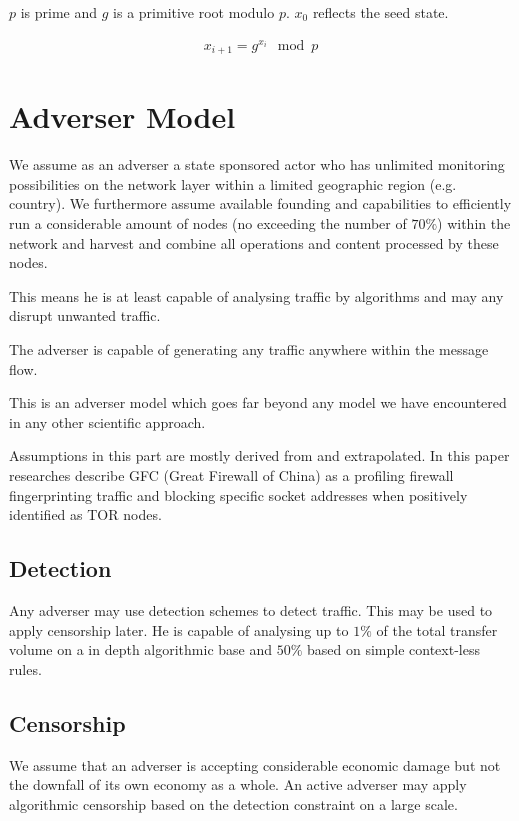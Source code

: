 \documentclass[9pt,journal,compsoc]{IEEEtran}
\begin{document}
$p$ is prime and $g$ is a primitive root modulo $p$. $x_0$ reflects the seed state.

\begin{eqnarray}
x_{i+1}=g^{x_i}\mod p
\end{eqnarray}


\section{Adverser Model\label{sec:adverser}}
We assume as an adverser a state sponsored actor who has unlimited monitoring possibilities on the network layer within a limited geographic region (e.g. country). We furthermore assume available founding and capabilities to efficiently run a considerable amount of nodes (no exceeding the number of $70\%$) within the network and harvest and combine all operations and content processed by these nodes.

This means he is at least capable of analysing traffic by algorithms and may any disrupt unwanted traffic.

The adverser is capable of generating any traffic anywhere within the message flow.

This is an adverser model which goes far beyond any model we have encountered in any other scientific approach.

Assumptions in this part are mostly derived from \cite{foci12-winter} and extrapolated. In this paper researches describe GFC (Great Firewall of China) as a profiling firewall fingerprinting traffic and blocking specific socket addresses when positively identified as TOR nodes. 

\subsection{Detection}
Any adverser may use detection schemes to detect traffic. This may be used to apply censorship later. He is capable of analysing up to $1\%$ of the total transfer volume on a in depth algorithmic base and $50\%$  based on simple context-less rules. 

\subsection{Censorship}
We assume that an adverser is accepting considerable economic damage but not the downfall of its own economy as a whole. An active adverser may apply algorithmic censorship based on the detection constraint on a large scale.
\end{document}
